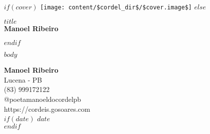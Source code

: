 \documentclass[10pt]{book}
\begin{document}
\thispagestyle{empty}
$if(cover)$
  \texttt{[image: content/\$cordel\_dir\$/\$cover.image\$]}
  \clearpage
  \restoregeometry
$else$
  \vspace*{\fill}
  \begin{center}
    {\Huge \textbf{$title$}}\\[1.5cm]
    {\Large \textbf{Manoel Ribeiro}}
  \end{center}
  \vspace*{\fill}
  \clearpage
$endif$

\pagestyle{cordel}
\setcounter{page}{1}

$body$

\clearpage
\thispagestyle{empty}
\begin{center}
  \LARGE \textbf{Manoel Ribeiro}\\[0.5cm]
  \large Lucena - PB\\
  \large (83) 999172122\\
  \large @poetamanoeldocordelpb\\
  \large https://cordeis.gosoares.com\\
  $if(date)$
  \large $date$\\
  $endif$
\end{center}
\end{document}
